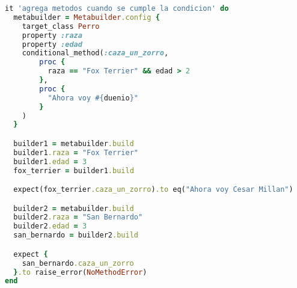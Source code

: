 \documentclass[spanish,a4paper]{article}
\begin{document}
  \begin{lstlisting}[language=Ruby]
it 'agrega metodos cuando se cumple la condicion' do
  metabuilder = Metabuilder.config {
    target_class Perro
    property :raza
    property :edad
    conditional_method(:caza_un_zorro,
        proc {
          raza == "Fox Terrier" && edad > 2
        },
        proc {
          "Ahora voy #{duenio}"
        }
    )
  }

  builder1 = metabuilder.build
  builder1.raza = "Fox Terrier"
  builder1.edad = 3
  fox_terrier = builder1.build

  expect(fox_terrier.caza_un_zorro).to eq("Ahora voy Cesar Millan")

  builder2 = metabuilder.build
  builder2.raza = "San Bernardo"
  builder2.edad = 3
  san_bernardo = builder2.build

  expect {
    san_bernardo.caza_un_zorro
  }.to raise_error(NoMethodError)
end
  \end{lstlisting}
\end{document}
